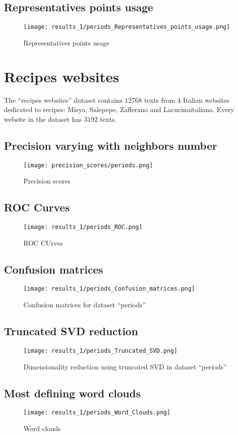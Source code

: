 \documentclass[\main/main.tex]{subfiles}
\begin{document}
\subsection{Representatives points usage}
\begin{figure}
	\texttt{[image: results\_1/periods\_Representatives\_points\_usage.png]}
	\caption{Representatives points usage}
\end{figure}

\clearpage
\section{Recipes websites}
The ``recipes websites'' dataset contains \(12768\) texts from 4 Italian websites dedicated to recipes: Misya, Salepepe, Zafferano and Lacucinaitaliana. Every website in the dataset has \(3192\) texts.
\subsection{Precision varying with neighbors number}
\begin{figure}
	\texttt{[image: precision\_scores/periods.png]}
	\caption{Precision scores}
\end{figure}
\subsection{ROC Curves}
\begin{figure}
	\texttt{[image: results\_1/periods\_ROC.png]}
	\caption{ROC CUrves}
\end{figure}
\subsection{Confusion matrices}
\begin{figure}
	\texttt{[image: results\_1/periods\_Confusion\_matrices.png]}
	\caption{Confusion matrices for dataset ``periods''}
\end{figure}
\subsection{Truncated SVD reduction}
\begin{figure}
	\texttt{[image: results\_1/periods\_Truncated\_SVD.png]}
	\caption{Dimensionality reduction using truncated SVD in dataset ``periods''}
\end{figure}
\subsection{Most defining word clouds}
\begin{figure}
	\texttt{[image: results\_1/periods\_Word\_Clouds.png]}
	\caption{Word clouds}
\end{figure}
\end{document}
